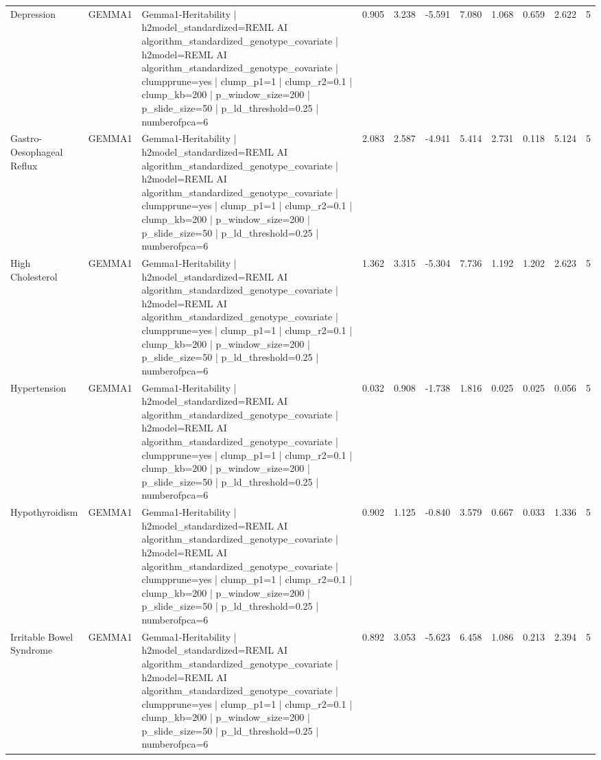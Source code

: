 \begin{landscape}
\begin{longtable}{p{2.4cm}p{1.8cm}p{6.0cm}rrrrrrrr}
Depression & GEMMA1 & Gemma1-Heritability | h2model\_standardized=REML AI algorithm\_standardized\_genotype\_covariate | h2model=REML AI algorithm\_standardized\_genotype\_covariate | clumpprune=yes | clump\_p1=1 | clump\_r2=0.1 | clump\_kb=200 | p\_window\_size=200 | p\_slide\_size=50 | p\_ld\_threshold=0.25 | numberofpca=6 & 0.905 & 3.238 & -5.591 & 7.080 & 1.068 & 0.659 & 2.622 & 5 \\
Gastro-Oesophageal Reflux & GEMMA1 & Gemma1-Heritability | h2model\_standardized=REML AI algorithm\_standardized\_genotype\_covariate | h2model=REML AI algorithm\_standardized\_genotype\_covariate | clumpprune=yes | clump\_p1=1 | clump\_r2=0.1 | clump\_kb=200 | p\_window\_size=200 | p\_slide\_size=50 | p\_ld\_threshold=0.25 | numberofpca=6 & 2.083 & 2.587 & -4.941 & 5.414 & 2.731 & 0.118 & 5.124 & 5 \\
High Cholesterol & GEMMA1 & Gemma1-Heritability | h2model\_standardized=REML AI algorithm\_standardized\_genotype\_covariate | h2model=REML AI algorithm\_standardized\_genotype\_covariate | clumpprune=yes | clump\_p1=1 | clump\_r2=0.1 | clump\_kb=200 | p\_window\_size=200 | p\_slide\_size=50 | p\_ld\_threshold=0.25 | numberofpca=6 & 1.362 & 3.315 & -5.304 & 7.736 & 1.192 & 1.202 & 2.623 & 5 \\
Hypertension & GEMMA1 & Gemma1-Heritability | h2model\_standardized=REML AI algorithm\_standardized\_genotype\_covariate | h2model=REML AI algorithm\_standardized\_genotype\_covariate | clumpprune=yes | clump\_p1=1 | clump\_r2=0.1 | clump\_kb=200 | p\_window\_size=200 | p\_slide\_size=50 | p\_ld\_threshold=0.25 | numberofpca=6 & 0.032 & 0.908 & -1.738 & 1.816 & 0.025 & 0.025 & 0.056 & 5 \\
Hypothyroidism & GEMMA1 & Gemma1-Heritability | h2model\_standardized=REML AI algorithm\_standardized\_genotype\_covariate | h2model=REML AI algorithm\_standardized\_genotype\_covariate | clumpprune=yes | clump\_p1=1 | clump\_r2=0.1 | clump\_kb=200 | p\_window\_size=200 | p\_slide\_size=50 | p\_ld\_threshold=0.25 | numberofpca=6 & 0.902 & 1.125 & -0.840 & 3.579 & 0.667 & 0.033 & 1.336 & 5 \\
Irritable Bowel Syndrome & GEMMA1 & Gemma1-Heritability | h2model\_standardized=REML AI algorithm\_standardized\_genotype\_covariate | h2model=REML AI algorithm\_standardized\_genotype\_covariate | clumpprune=yes | clump\_p1=1 | clump\_r2=0.1 | clump\_kb=200 | p\_window\_size=200 | p\_slide\_size=50 | p\_ld\_threshold=0.25 | numberofpca=6 & 0.892 & 3.053 & -5.623 & 6.458 & 1.086 & 0.213 & 2.394 & 5 \\

\end{longtable}
\end{landscape}
